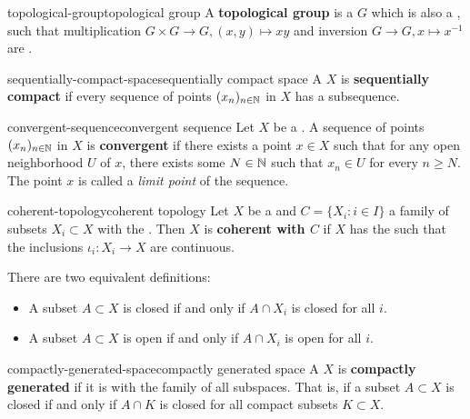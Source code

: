 \begin{topic}{topological-group}{topological group}
    A \textbf{topological group} is a  $G$ which is also a , such that multiplication $G \times G \to G, (x, y) \mapsto xy$ and inversion $G \to G, x \mapsto x^{-1}$ are .
\end{topic}

\begin{topic}{sequentially-compact-space}{sequentially compact space}
    A  $X$ is \textbf{sequentially compact} if every sequence of points $(x_n)_{n \in \mathbb{N}}$ in $X$ has a  subsequence.
\end{topic}

\begin{topic}{convergent-sequence}{convergent sequence}
    Let $X$ be a . A sequence of points $(x_n)_{n \in \mathbb{N}}$ in $X$ is \textbf{convergent} if there exists a point $x \in X$ such that for any open neighborhood $U$ of $x$, there exists some $N \in \mathbb{N}$ such that $x_n \in U$ for every $n \ge N$. The point $x$ is called a \textit{limit point} of the sequence.
\end{topic}

\begin{topic}{coherent-topology}{coherent topology}
    Let $X$ be a  and $C = \{ X_i : i \in I \}$ a family of subsets $X_i \subset X$ with the . Then $X$ is \textbf{coherent with $C$} if $X$ has the  such that the inclusions $\iota_i \colon X_i \to X$ are continuous.
    
    There are two equivalent definitions:
    \begin{itemize}
        \item A subset $A \subset X$ is closed if and only if $A \cap X_i$ is closed for all $i$.
        \item A subset $A \subset X$ is open if and only if $A \cap X_i$ is open for all $i$.
    \end{itemize}
\end{topic}

\begin{topic}{compactly-generated-space}{compactly generated space}
    A  $X$ is \textbf{compactly generated} if it is  with the family of all  subspaces. That is, if a subset $A \subset X$ is closed if and only if $A \cap K$ is closed for all compact subsets $K \subset X$.
\end{topic}

